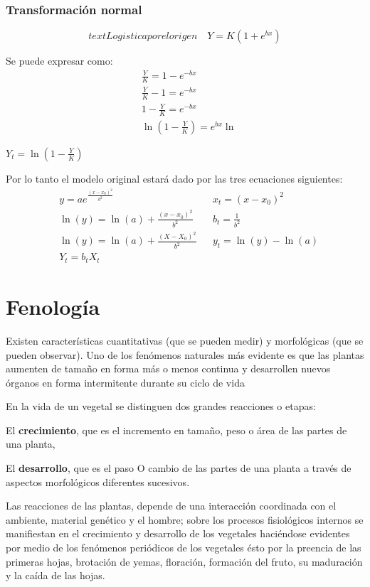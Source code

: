 \subsubsection{Transformación normal}

\begin{equation}
    text {Logistica por el origen}\quad Y = K\left(1 + e^{bx}\right)
\end{equation}

Se puede expresar como:
\begin{align*}
    &\frac{Y}{K} = 1 - e^{-bx}\\
    &\frac{Y}{K} - 1 = e^{-bx}\\
    &1 - \frac{Y}{K} = e^{-bx}\\
    &\ln{\left(1 - \frac{Y}{K} \right)} = e^{bx}    \ln
\end{align*}

$Y_t=\ln{\left(1- \frac{Y}{K} \right)}$

Por lo tanto el modelo original estará dado por las tres ecuaciones siguientes:
\begin{align}
    &y = ae^{\frac{\left(x - x_0\right)^2}{b^2}} && x_t =\left(x - x_0 \right)^2\\
    &\ln{(y)} =\ln{(a)} + \frac{\left(x - x_0\right)^2}{b^2}&&b_t = \frac{1}{b^2}\\
    &\ln{(y)} =\ln{(a)} + \frac{\left(X - X_0\right)^2}{b^2}&&y_t = \ln{(y)} -\ln{(a)}\\
    &Y_t = b_tX_t
\end{align}

\section{Fenología}
Existen características cuantitativas (que se pueden medir) y morfológicas (que se pueden observar). Uno de los fenómenos naturales más evidente es que las plantas aumenten de tamaño en forma más o menos continua y desarrollen nuevos órganos en forma intermitente durante su ciclo de vida

En la vida de un vegetal se distinguen dos grandes reacciones o etapas:

El \textbf{crecimiento}, que es el incremento en tamaño, peso o área de las partes de una planta,

El \textbf{desarrollo}, que es el paso O cambio de las partes de una planta a través de aspectos morfológicos diferentes sucesivos.

Las reacciones de las plantas, depende de una interacción coordinada con el ambiente, material genético y el hombre; sobre los procesos fisiológicos internos se manifiestan en el crecimiento y desarrollo de los vegetales haciéndose evidentes por medio de los fenómenos periódicos de los vegetales ésto por la preencia de las primeras hojas, brotación de yemas, floración, formación del fruto, su maduración y la caída de las hojas.

